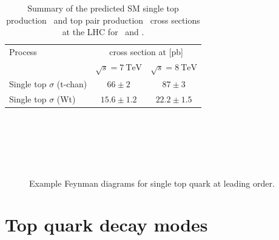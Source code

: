 \begin{table}[htbp]
  \centering
  \begin{tabular}{@{}lcc@{}}
  \toprule
  Process & \multicolumn{2}{c}{cross section at [\si{\pico\barn}]} \\
  \cmidrule{2-3}
  & $\sqrt{s}=\SI{7}{\TeV}$ & $\sqrt{s}=\SI{8}{\TeV}$ \\
  \midrule
  Single top $\sigma$ (t-chan)  & $66\pm2$         & $87\pm3$     \\
  Single top $\sigma$ (Wt)      & $15.6\pm1.2$     & $22.2\pm1.5$ \\
  \bottomrule
  \end{tabular}
  \caption[Summary of the predicted SM single top production and top pair production cross sections at the LHC for \cmsS\ and \cmsE.]{Summary of the predicted SM single top production~\cite{Kidonakis:2012rm} and top pair production~\cite{Czakon:2013goa} cross sections at the LHC for \cmsS\ and \cmsE.}\label{tab:TopQuarkPredictionCrossSection}
\end{table}
~%
\begin{figure}[htpb]
  \centering
  \begin{minipage}[][][t]{.47\textwidth}
    \centering
    
    \label{fig:TopSingleSChannel}
  \end{minipage}
  \,
  \begin{minipage}[][][t]{.47\textwidth}
    \centering
    
    \label{fig:TopSingletWChannel}
  \end{minipage}

  \begin{minipage}[][][t]{.47\textwidth}
    \centering
    
    \label{fig:TopSingleqtbChannel}
  \end{minipage}
  \,
  \begin{minipage}[][][t]{.47\textwidth}
    \centering
    
    \label{fig:TopSingleqtChannel}
  \end{minipage}
  \caption{Example Feynman diagrams for single top quark at leading order.}\label{fig:TopSingleProduction}
\end{figure}

\section{Top quark decay modes}\label{sec:top_quark_decay_modes}

